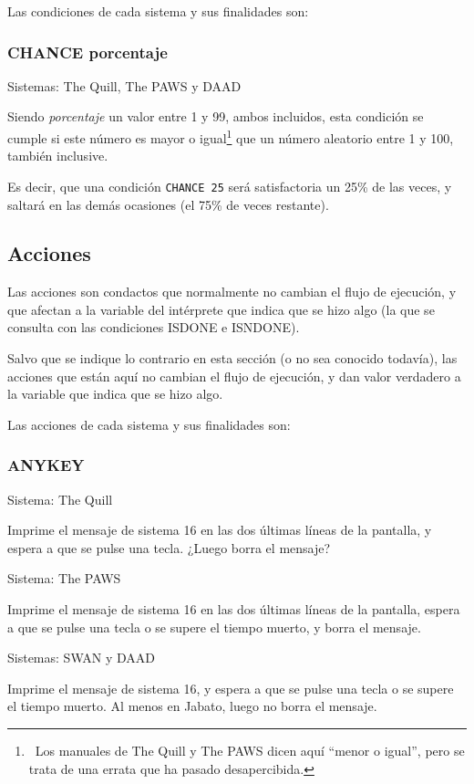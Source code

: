 \documentclass[11pt, a5paper]{article}
\newcommand{\quill}{\textsf{The Quill}\xspace}
\newcommand{\paw}{\textsf{The PAWS}\xspace}
\newcommand{\swan}{\textsf{SWAN}\xspace}
\newcommand{\daad}{\textsf{DAAD}\xspace}
\newcommand{\sistema}[1]{\noindent Sistema: #1 \nopagebreak}
\newcommand{\sistemas}[1]{\noindent Sistemas: #1 \nopagebreak}
\begin{document}
Las condiciones de cada sistema y sus finalidades son:

\subsubsection{CHANCE porcentaje}

\sistemas{\quill, \paw y \daad}

Siendo \emph{porcentaje} un valor entre 1 y 99, ambos incluidos, esta condición se cumple si este número es mayor o igual\footnote{\ Los manuales de \quill y \paw dicen aquí ``menor o igual'', pero se trata de una errata que ha pasado desapercibida.} que un número aleatorio entre 1 y 100, también inclusive.

Es decir, que una condición \texttt{CHANCE 25} será satisfactoria un 25\% de las veces, y saltará en las demás ocasiones (el 75\% de veces restante).


\subsection{Acciones}

Las acciones son condactos que normalmente no cambian el flujo de ejecución, y que afectan a la variable del intérprete que indica que se hizo algo (la que se consulta con las condiciones ISDONE e ISNDONE).

Salvo que se indique lo contrario en esta sección (o no sea conocido todavía), las acciones que están aquí no cambian el flujo de ejecución, y dan valor verdadero a la variable que indica que se hizo algo.

Las acciones de cada sistema y sus finalidades son:

\subsubsection{ANYKEY}

\sistema{\quill}

Imprime el mensaje de sistema 16 en las dos últimas líneas de la pantalla, y espera a que se pulse una tecla. ¿Luego borra el mensaje?

\sistema{\paw}

Imprime el mensaje de sistema 16 en las dos últimas líneas de la pantalla, espera a que se pulse una tecla o se supere el tiempo muerto, y borra el mensaje.

\sistemas{\swan y \daad}

Imprime el mensaje de sistema 16, y espera a que se pulse una tecla o se supere el tiempo muerto. Al menos en Jabato, luego no borra el mensaje.
\end{document}
